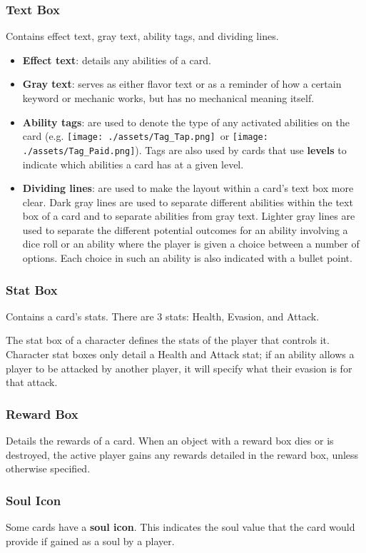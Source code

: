 \documentclass[10pt, a4paper, twoside]{article} %
\newcommand{\tap}{\texttt{[image: ./assets/Tag\_Tap.png]}}
\newcommand{\pay}{\texttt{[image: ./assets/Tag\_Paid.png]}}
\begin{document}
    \subsubsection*{Text Box} Contains effect text, gray text, ability tags, and dividing lines.
    \begin{itemize}
        \item \textbf{Effect text}: details any abilities of a card.
        \item \textbf{Gray text}: serves as either flavor text or as a reminder of how a certain keyword or mechanic works, but has no mechanical meaning itself.
        \item \textbf{Ability tags}: are used to denote the type of any activated abilities on the card (e.g. \tap\ or \pay). Tags are also used by cards that use \textbf{levels} to indicate which abilities a card has at a given level.
        \item \textbf{Dividing lines}: are used to make the layout within a card’s text box more clear. Dark gray lines are used to separate different abilities within the text box of a card and to separate abilities from gray text. Lighter gray lines are used to separate the different potential outcomes for an ability involving a dice roll or an ability where the player is given a choice between a number of options. Each choice in such an ability is also indicated with a bullet point.
    \end{itemize}
    \subsubsection*{Stat Box}
    Contains a card’s stats. There are 3 stats: Health, Evasion, and Attack.

    The stat box of a character defines the stats of the player that controls it. Character stat boxes only detail a Health and Attack stat; if an ability allows a player to be attacked by another player, it will specify what their evasion is for that attack.
    \subsubsection*{Reward Box}
    Details the rewards of a card. When an object with a reward box dies or is destroyed, the active player gains any rewards detailed in the reward box, unless otherwise specified.
    \subsubsection*{Soul Icon}
    Some cards have a \textbf{soul icon}. This indicates the soul value that the card would provide if gained as a soul by a player.
\end{document}
